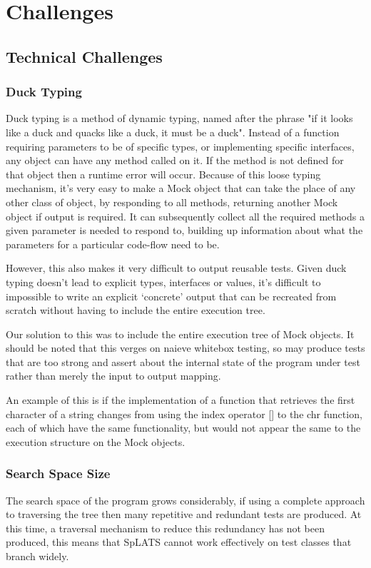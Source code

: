 \chapter{Challenges}
\section{Technical Challenges}
  \subsection{Duck Typing}
    Duck typing is a method of dynamic typing, named after the phrase "if it looks like a duck and quacks like a duck, it must be a duck".
    Instead of a function requiring parameters to be of specific types, or implementing specific interfaces, any object can have any method called on it.
    If the method is not defined for that object then a runtime error will occur.
    Because of this loose typing mechanism, it's very easy to make a Mock object that can take the place of any other class of object, by responding to all methods, returning another Mock object if output is required.
    It can subsequently collect all the required methods a given parameter is
needed to respond to, building up information about what the parameters for a particular code-flow need to be.

    However, this also makes it very difficult to output reusable tests.
    Given duck typing doesn't lead to explicit types, interfaces or values, it's difficult to impossible to write an explicit `concrete' output that can be recreated from scratch without having to include the entire execution tree.

    Our solution to this was to include the entire execution tree of Mock
objects. It should be noted that this verges on naieve whitebox testing, so may
produce tests that are too strong and assert about the internal state of the
program under test rather than merely the input to output mapping.

An example of this is if the implementation of a function that retrieves the
first character of a string changes from using the index operator [] to the chr
function, each of which have the same functionality, but would not appear the same
to the execution structure on the Mock objects.

  \subsection{Search Space Size}
    The search space of the program grows considerably, if using a complete
approach to traversing the tree then many repetitive and redundant tests are
produced. At this time, a traversal mechanism to reduce this redundancy has not
been produced, this means that SpLATS cannot work effectively on test classes
that branch widely.

